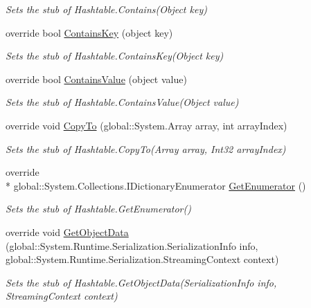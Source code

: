 \begin{DoxyCompactItemize}
\begin{DoxyCompactList}\small\item\em Sets the stub of Hashtable.\-Contains(\-Object key)\end{DoxyCompactList}\item 
override bool \hyperlink{class_system_1_1_configuration_1_1_fakes_1_1_stub_settings_attribute_dictionary_ab2db265c071dd4d2bf878548e36da000}{Contains\-Key} (object key)
\begin{DoxyCompactList}\small\item\em Sets the stub of Hashtable.\-Contains\-Key(\-Object key)\end{DoxyCompactList}\item 
override bool \hyperlink{class_system_1_1_configuration_1_1_fakes_1_1_stub_settings_attribute_dictionary_a132ffcdc16a67a9fb2aec91e1b2925d8}{Contains\-Value} (object value)
\begin{DoxyCompactList}\small\item\em Sets the stub of Hashtable.\-Contains\-Value(\-Object value)\end{DoxyCompactList}\item 
override void \hyperlink{class_system_1_1_configuration_1_1_fakes_1_1_stub_settings_attribute_dictionary_a24c1dc829cf4d8c600cf3e76125ab0d1}{Copy\-To} (global\-::\-System.\-Array array, int array\-Index)
\begin{DoxyCompactList}\small\item\em Sets the stub of Hashtable.\-Copy\-To(\-Array array, Int32 array\-Index)\end{DoxyCompactList}\item 
override \\*
global\-::\-System.\-Collections.\-I\-Dictionary\-Enumerator \hyperlink{class_system_1_1_configuration_1_1_fakes_1_1_stub_settings_attribute_dictionary_ada55cf5a7166220e095fbeb97d8c1958}{Get\-Enumerator} ()
\begin{DoxyCompactList}\small\item\em Sets the stub of Hashtable.\-Get\-Enumerator()\end{DoxyCompactList}\item 
override void \hyperlink{class_system_1_1_configuration_1_1_fakes_1_1_stub_settings_attribute_dictionary_a3e18c9f8bbca0e667edaa84df49b254a}{Get\-Object\-Data} (global\-::\-System.\-Runtime.\-Serialization.\-Serialization\-Info info, global\-::\-System.\-Runtime.\-Serialization.\-Streaming\-Context context)
\begin{DoxyCompactList}\small\item\em Sets the stub of Hashtable.\-Get\-Object\-Data(\-Serialization\-Info info, Streaming\-Context context)\end{DoxyCompactList}\item 

\end{DoxyCompactItemize}

